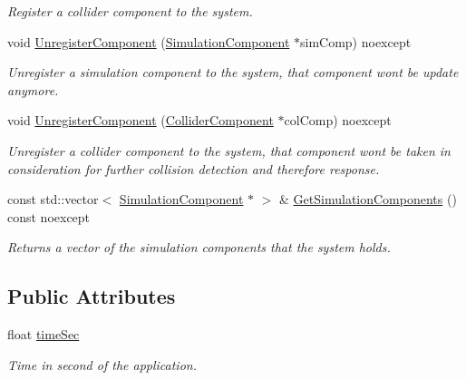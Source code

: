 \begin{DoxyCompactItemize}
\begin{DoxyCompactList}\small\item\em Register a collider component to the system. \end{DoxyCompactList}\item 
void \hyperlink{class_blade_1_1_simulation_system_abbe62f3517c05851909ee221d5a48c44}{Unregister\+Component} (\hyperlink{class_blade_1_1_simulation_component}{Simulation\+Component} $\ast$sim\+Comp) noexcept
\begin{DoxyCompactList}\small\item\em Unregister a simulation component to the system, that component won\textquotesingle{}t be update anymore. \end{DoxyCompactList}\item 
void \hyperlink{class_blade_1_1_simulation_system_ade3b0573c4addb1a306179fcc50a7454}{Unregister\+Component} (\hyperlink{class_blade_1_1_collider_component}{Collider\+Component} $\ast$col\+Comp) noexcept
\begin{DoxyCompactList}\small\item\em Unregister a collider component to the system, that component won\textquotesingle{}t be taken in consideration for further collision detection and therefore response. \end{DoxyCompactList}\item 
const std\+::vector$<$ \hyperlink{class_blade_1_1_simulation_component}{Simulation\+Component} $\ast$ $>$ \& \hyperlink{class_blade_1_1_simulation_system_a768e9c35386f9c52e2b06ce381ce7050}{Get\+Simulation\+Components} () const noexcept
\begin{DoxyCompactList}\small\item\em Returns a vector of the simulation components that the system holds. \end{DoxyCompactList}\end{DoxyCompactItemize}
\subsection*{Public Attributes}
\begin{DoxyCompactItemize}
\item 
\mbox{\label{class_blade_1_1_simulation_system_a529db90489191ac072e3906326393a3a}} 
float \hyperlink{class_blade_1_1_simulation_system_a529db90489191ac072e3906326393a3a}{time\+Sec}
\begin{DoxyCompactList}\small\item\em Time in second of the application. \end{DoxyCompactList}\end{DoxyCompactItemize}
